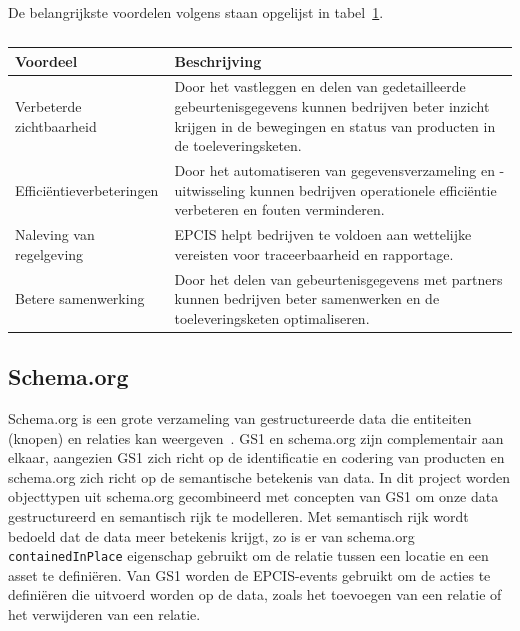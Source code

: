 De belangrijkste voordelen volgens \textcite{GS12025} staan opgelijst in tabel~\ref{tab:epcis-voordelen}.
\begin{table}[H]
    \centering
     \begin{tabular}{lp{}}
          \toprule
          \textbf{Voordeel} & \textbf{Beschrijving} \\
          \toprule
          Verbeterde zichtbaarheid & Door het vastleggen en delen van gedetailleerde gebeurtenisgegevens kunnen bedrijven beter inzicht krijgen in de bewegingen en status van producten in de toeleveringsketen. \\
          \midrule
          Efficiëntieverbeteringen & Door het automatiseren van gegevensverzameling en -uitwisseling kunnen bedrijven operationele efficiëntie verbeteren en fouten verminderen. \\
          \midrule
          Naleving van regelgeving & EPCIS helpt bedrijven te voldoen aan wettelijke vereisten voor traceerbaarheid en rapportage. \\
          \midrule
          Betere samenwerking & Door het delen van gebeurtenisgegevens met partners kunnen bedrijven beter samenwerken en de toeleveringsketen optimaliseren. \\
          \bottomrule
     \end{tabular}
     \caption[Belangrijkste voordelen van EPCIS volgens GS1]{\label{tab:epcis-voordelen}}
\end{table}


\subsection{Schema.org}
Schema.org is een grote verzameling van gestructureerde data die entiteiten (knopen) en relaties kan weergeven~\autocite{Douglas2023}.
GS1 en schema.org zijn complementair aan elkaar, aangezien GS1 zich richt op de identificatie en codering van producten en schema.org zich richt op de semantische betekenis van data.
In dit project worden objecttypen uit schema.org gecombineerd met concepten van GS1 om onze data gestructureerd en semantisch rijk te modelleren.
Met semantisch rijk wordt bedoeld dat de data meer betekenis krijgt, zo is er van schema.org \texttt{containedInPlace} eigenschap gebruikt om de relatie tussen een locatie en een asset te definiëren.
Van GS1 worden de EPCIS-events gebruikt om de acties te definiëren die uitvoerd worden op de data, zoals het toevoegen van een relatie of het verwijderen van een relatie.

